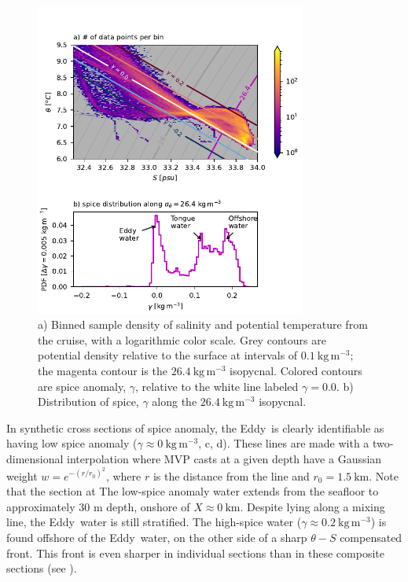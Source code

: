 \documentclass[draft]{agujournal2019}
\newcommand*{\Eddy}{{\sc Eddy}}
\begin{document}
\begin{figure}[htbp]
  \begin{center}
     \includegraphics[width=3.5in]{TSdensSpice.pdf}
    \caption{a) Binned sample density of salinity and potential temperature from the cruise, with a logarithmic color scale.  Grey contours are potential density relative to the surface at intervals of $0.1\ \mathrm{kg\,m^{-3}}$; the magenta contour is the $26.4\ \mathrm{kg\,m^{-3}}$ isopycnal.  Colored contours are spice anomaly, $\gamma$, relative to the white line labeled $\gamma=0.0$.  b) Distribution of spice, $\gamma$ along the $26.4\ \mathrm{kg\,m^{-3}}$ isopycnal.
    \label{fig:TSdensSpice}}
  \end{center}
\end{figure}

In synthetic cross sections of spice anomaly, the \Eddy\ is clearly identifiable as having low spice anomaly ($\gamma \approx 0\ \mathrm{kg\,m^{-3}}$, c, d). These lines are made with a two-dimensional interpolation where MVP casts at a given depth have a Gaussian weight $w = e^{-(r/r_0)^2}$, where $r$ is the distance from the line and $r_0 = 1.5\ \mathrm{km}$.  Note that the section at   The low-spice anomaly water extends from the seafloor to approximately 30 m depth, onshore of $X \approx 0\ \mathrm{km}$.  Despite lying along a mixing line, the \Eddy\ water is still stratified.  The high-spice water ($\gamma \approx 0.2\ \mathrm{kg\,m^{-3}}$) is found offshore of the \Eddy\ water, on the other side of a sharp $\theta-S$ compensated front. This front is even sharper in individual sections than in these composite sections (see ).
\end{document}
